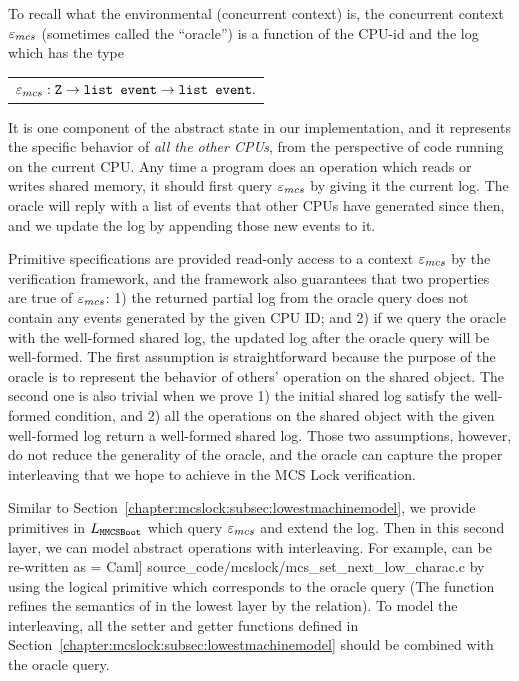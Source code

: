 To recall what the environmental (concurrent context) is,
the concurrent context ${\varepsilon}_{mcs}$ (sometimes called the ``oracle'') is
a function of the CPU-id and the log which has the type\newline
\begin{tabular}{P{0.95\textwidth}}
    ${\varepsilon}_{mcs}: {\mathrm{\texttt{Z}}}\rightarrow{\mathrm{\texttt{list event}}}\rightarrow {\mathrm{\texttt{list event}}}.$\\
\end{tabular}\newline
It is one component of the abstract state in our implementation, and it represents the specific behavior of \emph{all
the other CPUs}, from the perspective of code running on the current
CPU.  Any time a program does an operation which reads or writes
shared memory, it should first query ${\varepsilon}_{mcs}$ by giving it the
current log. The oracle will reply with a list of events that other
CPUs have generated since then, and we update the log by appending
those new events to it.

Primitive specifications are provided read-only access to a context
${\varepsilon}_{mcs}$ by the verification framework, and the framework also
guarantees that two properties are true of ${\varepsilon}_{mcs}$: 1) the returned
partial log from the oracle query does not contain any events
generated by the given CPU ID; and 2) if we query the oracle with the
well-formed shared log, the updated log after the oracle query will
be well-formed.
The first assumption is straightforward because the purpose of the oracle is to represent the behavior of others' operation on the shared object.
The second one is also trivial when we prove 1) the initial shared log satisfy the well-formed condition, and 2) all the operations on the shared object with the given well-formed log return a well-formed shared log.
Those two assumptions, however, do not reduce the generality of the oracle, and the oracle can capture the proper interleaving that we hope to achieve in the MCS Lock verification.

Similar to Section~\ref{chapter:mcslock:subsec:lowestmachinemodel}, 
we provide primitives in $L_{{\mathrm{\texttt{MMCSBoot}}}}$ which query ${\varepsilon}_{mcs}$ and extend the log.
Then in this second layer, we can model abstract operations with interleaving.
For example,  can be re-written as
 = Caml] {source_code/mcslock/mcs_set_next_low_charac.c}
by using the logical primitive which corresponds to the oracle query
(The function  refines the semantics of  in the lowest layer by the  relation).
To model the interleaving, all the setter and getter functions defined
in Section~\ref{chapter:mcslock:subsec:lowestmachinemodel} should be combined with the
oracle query.

